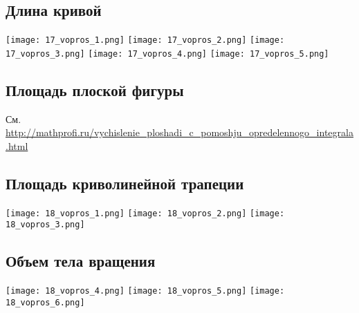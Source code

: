 \documentclass[a4paper,12pt]{article}
\begin{document}
\subsection{Длина кривой}
\texttt{[image: 17\_vopros\_1.png]}
\texttt{[image: 17\_vopros\_2.png]}
\texttt{[image: 17\_vopros\_3.png]}
\texttt{[image: 17\_vopros\_4.png]}
\texttt{[image: 17\_vopros\_5.png]}

\subsection{Площадь плоской фигуры}
См. \url{http://mathprofi.ru/vychislenie_ploshadi_c_pomoshju_opredelennogo_integrala.html}

\subsection{Площадь криволинейной трапеции}
\texttt{[image: 18\_vopros\_1.png]}
\texttt{[image: 18\_vopros\_2.png]}
\texttt{[image: 18\_vopros\_3.png]}

\subsection{Объем тела вращения}
\texttt{[image: 18\_vopros\_4.png]}
\texttt{[image: 18\_vopros\_5.png]}
\texttt{[image: 18\_vopros\_6.png]}
\end{document}

